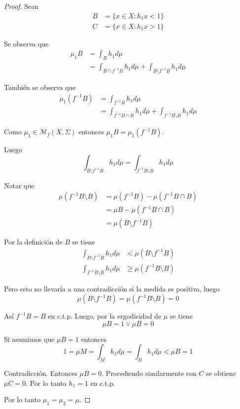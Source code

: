 \begin{proof}
	Sean
	\begin{align}
		B &= \{ x \in X: h_1 x < 1 \}\\
		C &= \{ x \in X: h_1 x > 1 \}
	\end{align}
	
	Se observa que
	\begin{align}
		\mu_1 B &= \int_B h_1 d\mu\\
		&= \int_{B \cap f^{-1}B} h_1 d\mu + \int_{B \setminus f^{-1}B} h_1 d\mu
	\end{align}
	
	También se observa que
	\begin{align}
		\mu_1(f^{-1}B) &= \int_{f^{-1}B} h_1 d\mu\\
		&= \int_{f^{-1}B \cap B} h_1 d\mu + \int_{f^{-1}B \setminus B} h_1 d\mu
	\end{align}
	
	Como $\mu_1 \in \mathcal{M}_f(X,\Sigma)$ entonces $\mu_1 B = \mu_1(f^{-1}B)$.
	
	Luego
	\begin{equation}
		\int_{B \setminus f^{-1}B} h_1 d\mu = \int_{f^{-1}B \setminus B} h_1 d\mu
	\end{equation}
	
	Notar que
	\begin{align}
		\mu(f^{-1}B \setminus B) &= \mu(f^{-1}B) - \mu(f^{-1}B \cap B)\\
		&= \mu B - \mu(f^{-1}B \cap B)\\
		&= \mu(B \setminus f^{-1}B)
	\end{align}
	
	Por la definición de $B$ se tiene
	\begin{align}
		\int_{B \setminus f^{-1}B} h_1 d\mu &< \mu(B \setminus f^{-1}B)\\
		\int_{f^{-1}B \setminus B} h_1 d\mu &\geq \mu(f^{-1}B \setminus B)
	\end{align}
	
	Pero esto no llevaría a una contradicción si la medida es positiva, luego
	\begin{equation}
		\mu(B \setminus f^{-1}B) = \mu(f^{-1}B \setminus B) = 0
	\end{equation}
	
	Así $f^{-1}B=B$ en c.t.p. Luego, por la ergodicidad de $\mu$ se tiene
	\begin{equation}
		\mu B = 1 \vee \mu B = 0
	\end{equation}
	
	Si asumimos que $\mu B = 1$ entonces
	\begin{equation}
		1 = \mu M = \int_M h_1 d\mu = \int_B h_1 d\mu < \mu B = 1
	\end{equation}
	
	Contradicción. Entonces $\mu B = 0$. Procediendo similarmente con $C$ se obtiene $\mu C = 0$. Por lo tanto $h_1 = 1$ en c.t.p.
	
	Por lo tanto $\mu_1=\mu_2=\mu$.
\end{proof}

